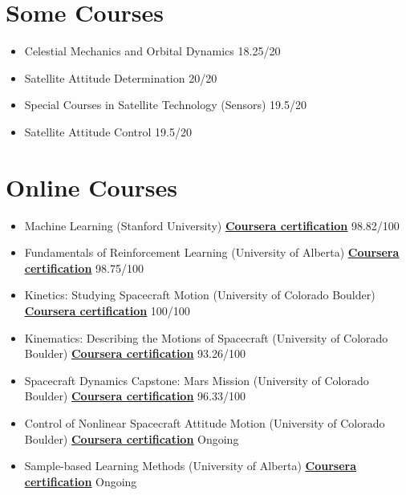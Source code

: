 \documentclass[10pt,a4paper,sans]{moderncv} %
\begin{document}
\section{Some Courses}
\begin{multicols}{2}  %
	\begin{itemize}
		
		\item Celestial Mechanics and Orbital Dynamics   	 	\hfill{18.25/20}
		\item Satellite Attitude Determination  					 	\hfill{20/20}              
		\item Special Courses in Satellite Technology (Sensors)             		 	\hfill{19.5/20}
		\item Satellite Attitude Control            	 	\hfill{19.5/20} 
		
	\end{itemize}
\end{multicols}

\section{Online Courses}

	\begin{itemize}
		\item Machine Learning (Stanford University)  \textbf{\href{https://coursera.org/verify/BCTCN2JXRGRD} {\underline{Coursera certification}}}	\hfill{98.82/100}
		\item Fundamentals of Reinforcement Learning (University of Alberta)  \textbf{\href{https://coursera.org/verify/9BYJ37J7UPAY} {\underline{Coursera certification}}}  					 	\hfill{98.75/100} 
		\item Kinetics: Studying Spacecraft Motion (University of Colorado Boulder)  \textbf{\href{https://coursera.org/verify/E9RVRNYBTUFB} {\underline{Coursera certification}}}	\hfill{100/100}
		\item Kinematics: Describing the Motions of Spacecraft (University of Colorado Boulder)  \textbf{\href{https://coursera.org/verify/G53HFNRJ9JBL} {\underline{Coursera certification}}}	\hfill{93.26/100}
		\item Spacecraft Dynamics Capstone: Mars Mission (University of Colorado Boulder)  \textbf{\href{https://coursera.org/verif y/DDJTUCGB66BG} {\underline{Coursera certification}}}	\hfill{96.33/100}
		\item Control of Nonlinear Spacecraft Attitude Motion (University of Colorado Boulder)  \textbf{\href{....} {\underline{Coursera certification}}}	\hfill{Ongoing}
		\item Sample-based Learning Methods (University of Alberta)  \textbf{\href{...} {\underline{Coursera certification}}}  					 	\hfill{Ongoing} 		
	     
	\end{itemize}
\end{document}
